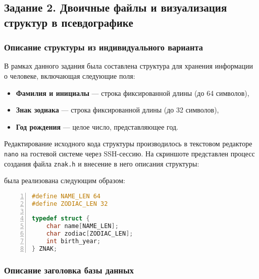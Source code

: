 \subsection{Задание 2. Двоичные файлы и визуализация структур в псевдографике}

\subsubsection*{Описание структуры из индивидуального варианта}

В рамках данного задания была составлена структура для хранения информации о человеке, включающая следующие поля:
\begin{itemize}
  \item \textbf{Фамилия и инициалы} --- строка фиксированной длины (до 64 символов),
  \item \textbf{Знак зодиака} --- строка фиксированной длины (до 32 символов),
  \item \textbf{Год рождения} --- целое число, представляющее год.
\end{itemize}

Редактирование исходного кода структуры производилось в текстовом редакторе \texttt{nano} на гостевой системе через SSH-сессию. На скриншоте представлен процесс создания файла \texttt{znak.h} и внесение в него описания структуры:


 была реализована следующим образом:
\begin{lstlisting}[language=C, numbers=left, caption=Описание структуры ZNAK]
#define NAME_LEN 64
#define ZODIAC_LEN 32

typedef struct {
    char name[NAME_LEN];
    char zodiac[ZODIAC_LEN];
    int birth_year;
} ZNAK;
\end{lstlisting}

\subsubsection*{Описание заголовка базы данных}


